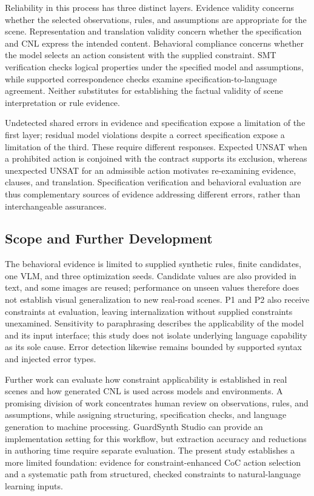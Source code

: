 \documentclass[nolineno]{ieeeaccess}
\begin{document}
Reliability in this process has three distinct layers. Evidence validity concerns whether the selected observations, rules, and assumptions are appropriate for the scene. Representation and translation validity concern whether the specification and CNL express the intended content. Behavioral compliance concerns whether the model selects an action consistent with the supplied constraint. SMT verification checks logical properties under the specified model and assumptions, while supported correspondence checks examine specification-to-language agreement. Neither substitutes for establishing the factual validity of scene interpretation or rule evidence.\par

Undetected shared errors in evidence and specification expose a limitation of the first layer; residual model violations despite a correct specification expose a limitation of the third. These require different responses. Expected UNSAT when a prohibited action is conjoined with the contract supports its exclusion, whereas unexpected UNSAT for an admissible action motivates re-examining evidence, clauses, and translation. Specification verification and behavioral evaluation are thus complementary sources of evidence addressing different errors, rather than interchangeable assurances.\par

\subsection{Scope and Further Development}

The behavioral evidence is limited to supplied synthetic rules, finite candidates, one VLM, and three optimization seeds. Candidate values are also provided in text, and some images are reused; performance on unseen values therefore does not establish visual generalization to new real-road scenes. P1 and P2 also receive constraints at evaluation, leaving internalization without supplied constraints unexamined. Sensitivity to paraphrasing describes the applicability of the model and its input interface; this study does not isolate underlying language capability as its sole cause. Error detection likewise remains bounded by supported syntax and injected error types.\par

Further work can evaluate how constraint applicability is established in real scenes and how generated CNL is used across models and environments. A promising division of work concentrates human review on observations, rules, and assumptions, while assigning structuring, specification checks, and language generation to machine processing. GuardSynth Studio can provide an implementation setting for this workflow, but extraction accuracy and reductions in authoring time require separate evaluation. The present study establishes a more limited foundation: evidence for constraint-enhanced CoC action selection and a systematic path from structured, checked constraints to natural-language learning inputs.\par
\end{document}
